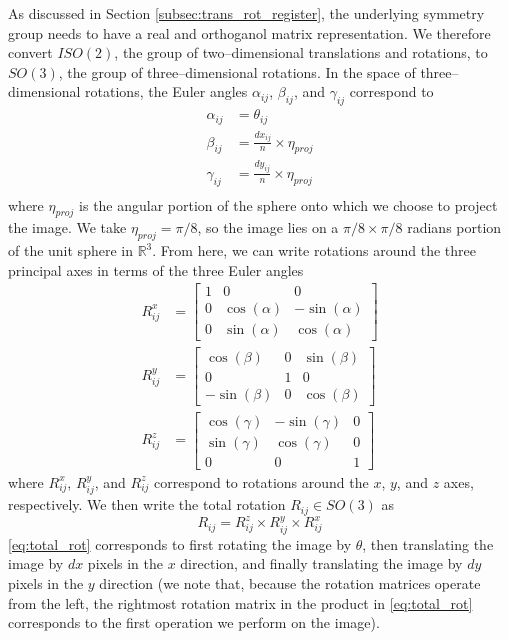 \documentclass[11pt]{article}
\begin{document}
As discussed in Section \ref{subsec:trans_rot_register}, the underlying symmetry group needs to have a real and orthoganol matrix representation. 
%
We therefore convert $ISO(2)$, the group of two--dimensional translations and rotations, to $SO(3)$, the group of three--dimensional rotations. 
%
In the space of three--dimensional rotations, the Euler angles $\alpha_{ij}$, $\beta_{ij}$, and $\gamma_{ij}$ correspond to
\begin{equation} \label{eq:angle_relations}
\begin{aligned}
	\alpha_{ij} &= \theta_{ij} \\
	\beta_{ij} &= \frac{dx_{ij}}{n} \times \eta_{proj} \\
	\gamma_{ij} &= \frac{dy_{ij}}{n} \times \eta_{proj} \\
\end{aligned}
\end{equation}
where $\eta_{proj}$ is the angular portion of the sphere onto which we choose to project the image.
%
We take $\eta_{proj} =  \pi/8$, so the image lies on a $\pi/8 \times \pi/8$ radians portion of the unit sphere in $\mathbb{R}^3$.
%
From here, we can write rotations around the three principal axes in terms of the three Euler angles
\begin{equation}
\begin{aligned}
	R^x_{ij} &= \begin{bmatrix}
	1 & 0 & 0 \\
    0 & \cos(\alpha) & -\sin(\alpha) \\
    0 & \sin(\alpha) & \cos(\alpha)
	\end{bmatrix} \\
	R^y_{ij} &= \begin{bmatrix}
	\cos(\beta) & 0 & \sin(\beta) \\
    0 & 1 & 0 \\
    -\sin(\beta) & 0 & \cos(\beta)
    \end{bmatrix} \\
	R^z_{ij} &= \begin{bmatrix} 
	\cos(\gamma) & -\sin(\gamma) & 0 \\
    \sin(\gamma) & \cos(\gamma) & 0 \\
    0 & 0 & 1 
    \end{bmatrix}
\end{aligned}
\end{equation}
where $R^x_{ij}$, $R^y_{ij}$, and $R^z_{ij}$ correspond to rotations around the $x$, $y$, and $z$ axes, respectively.
%
We then write the total rotation $R_{ij} \in SO(3)$ as 
\begin{equation} \label{eq:total_rot}
	R_{ij}	 = R^z_{ij} \times R^y_{ij} \times R^x_{ij}
\end{equation}
%
\eqref{eq:total_rot} corresponds to first rotating the image by $\theta$, then translating the image by $dx$ pixels in the $x$ direction, and finally translating the image by $dy$ pixels in the $y$ direction (we note that, because the rotation matrices operate from the left, the rightmost rotation matrix in the product in \eqref{eq:total_rot} corresponds to the first operation we perform on the image).
\end{document}
